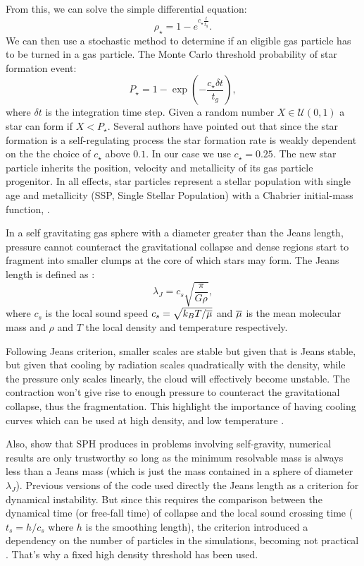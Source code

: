 From this, we can solve the simple differential equation:
\begin{equation}
\rho_\star = 1 - e^{c_\star \frac{t}{t_g}}.
\end{equation}
We can then use a stochastic method to determine if an eligible gas particle has to be turned in a gas particle.
The Monte Carlo threshold probability of star formation event:
\begin{equation}
P_\star = 1-\exp(-\frac{c_\star \delta t}{t_g}),
\end{equation}
where $\delta t$ is the integration time step.
Given a random number $X \in \mathcal{U}(0,1)$ a star can form if $X < P_\star$.
Several authors \citep{Stinson2006, Revaz2009, Cloet-Osselaer2012} have pointed out that since the star formation is a self-regulating process the star formation rate is weakly dependent on the the choice of $c_\star$ above $0.1$. In our case we use $c_\star = 0.25$.
The new star particle inherits the position, velocity and metallicity of its gas particle progenitor.
In all effects, star particles represent a stellar population with single age and metallicity (SSP, Single Stellar Population) with a Chabrier initial-mass function, \citet{Chabrier2003}.

In a self gravitating gas sphere with a diameter greater than the Jeans length, pressure cannot counteract the gravitational collapse and dense regions start to fragment into smaller clumps at the core of which stars may form.
The Jeans length is defined as \citep{Jeans1902}:
\begin{equation}
 \lambda_J = c_s\sqrt{\frac{\pi}{G \rho}},
\end{equation}
where $c_s$ is the local sound speed $c_s=\sqrt{k_BT/\overline{\mu}}$ and $\overline{\mu}$ is the mean molecular mass and $\rho$ and $T$ the local density and temperature respectively.

Following Jeans criterion, smaller scales are stable but given that is Jeans stable, but given that cooling by radiation scales quadratically with the density, while the pressure only scales linearly, the cloud will effectively become unstable.
The contraction won't give rise to enough pressure to counteract the gravitational collapse, thus the fragmentation.
This highlight the importance of having cooling curves which can be used at high density, and low temperature \citep{DeRijcke2013}.

Also, \citet{Bate1997} show that SPH produces in problems involving self-gravity, numerical results are only trustworthy so long as the minimum resolvable mass is always less than a Jeans mass (which is just the mass contained in a sphere of diameter $\lambda_J$).
Previous versions of the code used directly the Jeans length as a criterion for dynamical instability.
But since this requires the comparison between the dynamical time (or free-fall time) of collapse and the local sound crossing time ($t_s = h/c_s$ where $h$ is the smoothing length), the criterion introduced a dependency on the number of particles in the simulations, becoming not practical \citep{Valcke2008, Stinson2006}. That's why a fixed high density threshold has been used.

